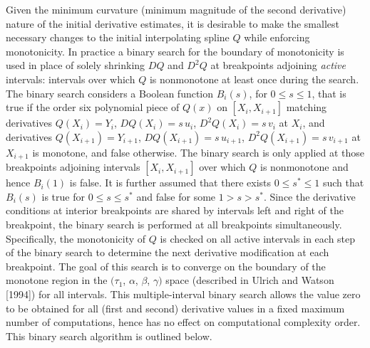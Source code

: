 Given the minimum curvature (minimum magnitude of the second derivative)
nature of the initial derivative estimates, it is desirable to make
the smallest necessary changes to the initial interpolating spline $Q$
while enforcing monotonicity. In practice a binary search for the
boundary of monotonicity is used in place of solely shrinking $DQ$ and
$D^2Q$ at breakpoints adjoining {\it active\/} intervals: intervals
over which $Q$ is nonmonotone at least once during the search. The
binary search considers a Boolean function $B_i(s)$, for $0 \le s \le
1$, that is true if the order six polynomial piece of $Q(x)$ on
$[X_i, X_{i+1}]$ matching derivatives
$Q(X_i)=Y_i$, $DQ(X_i)=s \,u_i$, $D^2Q(X_i)=s \,v_i$ at $X_i$, and 
derivatives $Q(X_{i+1})=Y_{i+1}$, $DQ(X_{i+1})=s \,u_{i+1}$, 
$D^2Q(X_{i+1})=s \,v_{i+1}$ at $X_{i+1}$ is monotone, and false
otherwise.  The binary search is only applied at those breakpoints
adjoining intervals $[X_i, X_{i+1}]$ over which $Q$ is nonmonotone and
hence $B_i(1)$ is false.  It is further assumed that there exists
$0 \le s^* \le 1$ such that $B_i(s)$ is true for $0 \le s \le s^*$ and
false for some $1 > s > s^*$. Since the derivative conditions at
interior breakpoints are shared by intervals left and right of the
breakpoint, the binary search is performed at all breakpoints
simultaneously.  Specifically, the monotonicity of $Q$ is checked on
all active intervals in each step of the binary search to determine
the next derivative modification at each breakpoint. The goal of this
search is to converge on the boundary of the monotone region in the
$(\tau_1$, $\alpha$, $\beta$, $\gamma)$ space (described in Ulrich and
Watson [1994]) for all intervals. This multiple-interval binary search
allows the value zero to be obtained for all (first and second)
derivative values in a fixed maximum number of computations, hence has
no effect on computational complexity order. This binary search
algorithm is outlined below.


